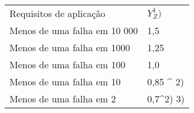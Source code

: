 \begin{table}[]
\begin{tabular}{ll}
Requisitos de aplicação      & $Y_Z^1)$    \\
Menos de uma falha em 10 000 & 1,5       \\
Menos de uma falha em 1000   & 1,25      \\
Menos de uma falha em 100    & 1,0       \\
Menos de uma falha em 10     & 0,85 ^ 2)   \\
Menos de uma falha em 2      & 0,7^2) 3)
\end{tabular}
\end{table}